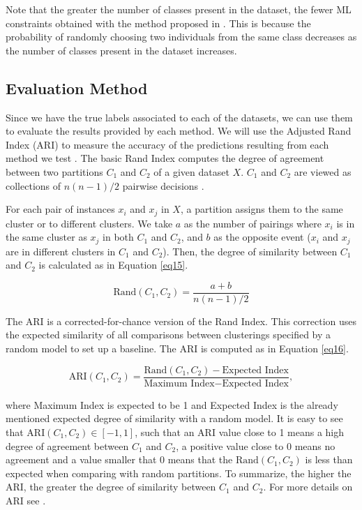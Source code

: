 \documentclass[review]{elsarticle}
\begin{document}
Note that the greater the number of classes present in the dataset, the fewer ML constraints obtained with the method proposed in \cite{wagstaff2001constrained}. This is because the probability of randomly choosing two individuals from the same class decreases as the number of classes present in the dataset increases.

\clearpage

\subsection{Evaluation Method} \label{sec:EvalMet}

Since we have the true labels associated to each of the datasets, we can use them to evaluate the results provided by each method. We will use the Adjusted Rand Index (ARI) to measure the accuracy of the predictions resulting from each method we test \cite{hubert1985comparing}. The basic Rand Index computes the degree of agreement between two partitions $C_1$ and $C_2$ of a given dataset $X$. $C_1$ and $C_2$ are viewed as collections of $n(n - 1)/2$ pairwise decisions \cite{rand1971objective}.

For each pair of instances $x_i$ and $x_j$ in $X$, a partition assigns them to the same cluster or to different clusters. We take $a$ as the number of pairings where $x_i$ is in the same cluster as $x_j$ in both $C_1$ and $C_2$, and $b$ as the opposite event ($x_i$ and $x_j$ are in different clusters in $C_1$ and $C_2$). Then, the degree of similarity between $C_1$ and $C_2$ is calculated as in Equation \eqref{eq15}.

\begin{equation}
\text{Rand}(C_1, C_2) = \frac{a + b}{n(n - 1)/2}
\label{eq15}
\end{equation}

The ARI is a corrected-for-chance version of the Rand Index. This correction uses the expected similarity of all comparisons between clusterings specified by a random model to set up a baseline. The ARI is computed as in Equation \eqref{eq16}.

\begin{equation}
\text{ARI}(C_1, C_2) = \frac{\text{Rand}(C_1, C_2) - \text{Expected Index}}{\text{Maximum Index} - \text{Expected Index}},
\label{eq16}
\end{equation}

\noindent where Maximum Index is expected to be 1 and Expected Index is the already mentioned expected degree of similarity with a random model. It is easy to see that $\text{ARI}(C_1, C_2) \in [-1,1]$, such that an ARI value close to 1 means a high degree of agreement between $C_1$ and $C_2$, a positive value close to 0 means no agreement and a value smaller that 0 means that the $\text{Rand}(C_1, C_2)$ is less than expected when comparing with random partitions. To summarize, the higher the ARI, the greater the degree of similarity between $C_1$ and $C_2$. For more details on ARI see \cite{hubert1985comparing}.
\end{document}
